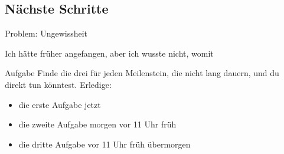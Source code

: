 %
%
%
%
%
%
%


\subsection{Nächste Schritte}


\begin{frame}[c]{Problem: Ungewissheit}
    \Large
    \begin{aquote}{}
        Ich hätte früher angefangen, aber ich wusste nicht, womit
    \end{aquote}
\end{frame}


\begin{frame}[c]
    \begin{block}{Aufgabe}
        Finde die drei  für jeden Meilenstein, die nicht lang
        dauern, und du direkt tun könntest. Erledige:
        \begin{itemize}[<+(1)->]
            \item die erste Aufgabe jetzt
            \item die zweite Aufgabe morgen vor 11 Uhr früh
            \item die dritte Aufgabe vor 11 Uhr früh übermorgen
        \end{itemize}
    \end{block}
\end{frame}


